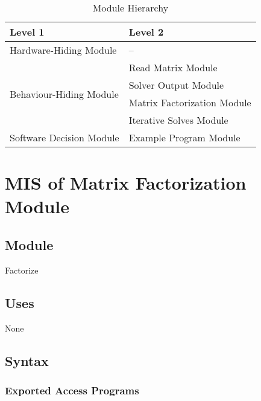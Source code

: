\documentclass[12pt, titlepage]{article}
\begin{document}
\begin{table}[H]
  \centering
  \begin{tabular}{p{} p{}}
    \toprule
    \textbf{Level 1}                                            & \textbf{Level 2}                               \\
    \midrule
    {Hardware-Hiding Module}                              & --                                       \\
    \midrule
    \multirow{4}{0.3\textwidth}{Behaviour-Hiding Module}  & Read Matrix Module                       \\
                                                          & Solver Output Module                     \\
                                                          & Matrix Factorization Module              \\
                                                          & Iterative Solves Module                  \\
    \midrule
    \multirow{1}{0.3\textwidth}{Software Decision Module} & Example Program Module                   \\
    \bottomrule
  \end{tabular}
  \caption{Module Hierarchy}
  \label{TblMH}
\end{table}

\newpage

\section{MIS of Matrix Factorization Module} \label{M:factor}

\subsection{Module}

Factorize

\subsection{Uses}

None

\subsection{Syntax}

\subsubsection{Exported Access Programs}
\end{document}
